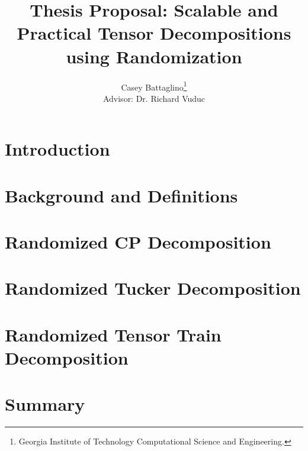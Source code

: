 \documentclass[12pt]{report}
\begin{document}
\title{Thesis Proposal: Scalable and Practical Tensor Decompositions using Randomization}
\author {
	Casey Battaglino\thanks{Georgia Institute of Technology Computational Science and Engineering.}
	\\ Advisor: Dr. Richard Vuduc
}
\maketitle
\tableofcontents
% 

\section{Introduction}\label{sec:introduction}


\section{Background and Definitions} \label{sec:background} 



\section{Randomized CP Decomposition} \label{sec:cp} 


\section{Randomized Tucker Decomposition} \label{sec:tucker} 


\section{Randomized Tensor Train Decomposition} \label{sec:tt} 


\section{Summary} \label{sec:summary} 


% 
%



\end{document}
